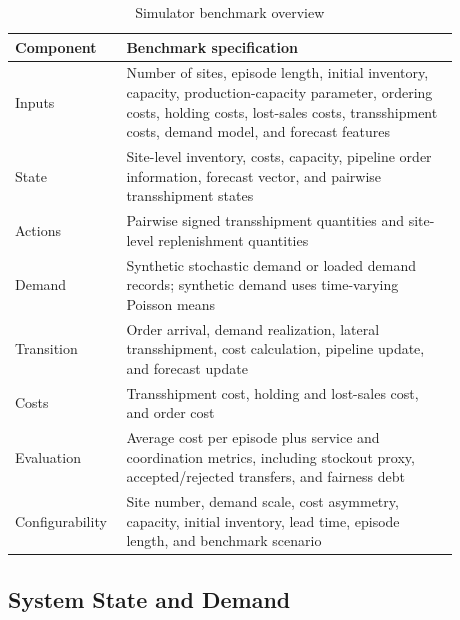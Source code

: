 \documentclass[journal]{IEEEtran}
\begin{document}
\begin{table}[t]
	\centering
	\footnotesize
	\caption{Simulator benchmark overview}
	\label{table:simulator_overview}
	\begin{tabular}{>{\centering\arraybackslash}m{0.18\linewidth}|>{\raggedright\arraybackslash}m{0.70\linewidth}}
		\hline
		\textbf{Component} & \textbf{Benchmark specification} \\ \hline
		Inputs & Number of sites, episode length, initial inventory, capacity, production-capacity parameter, ordering costs, holding costs, lost-sales costs, transshipment costs, demand model, and forecast features \\ \hline
		State & Site-level inventory, costs, capacity, pipeline order information, forecast vector, and pairwise transshipment states \\ \hline
		Actions & Pairwise signed transshipment quantities and site-level replenishment quantities \\ \hline
		Demand & Synthetic stochastic demand or loaded demand records; synthetic demand uses time-varying Poisson means \\ \hline
		Transition & Order arrival, demand realization, lateral transshipment, cost calculation, pipeline update, and forecast update \\ \hline
		Costs & Transshipment cost, holding and lost-sales cost, and order cost \\ \hline
		Evaluation & Average cost per episode plus service and coordination metrics, including stockout proxy, accepted/rejected transfers, and fairness debt \\ \hline
		Configurability & Site number, demand scale, cost asymmetry, capacity, initial inventory, lead time, episode length, and benchmark scenario \\ \hline
	\end{tabular}
\end{table}

\subsection{System State and Demand}
\end{document}
